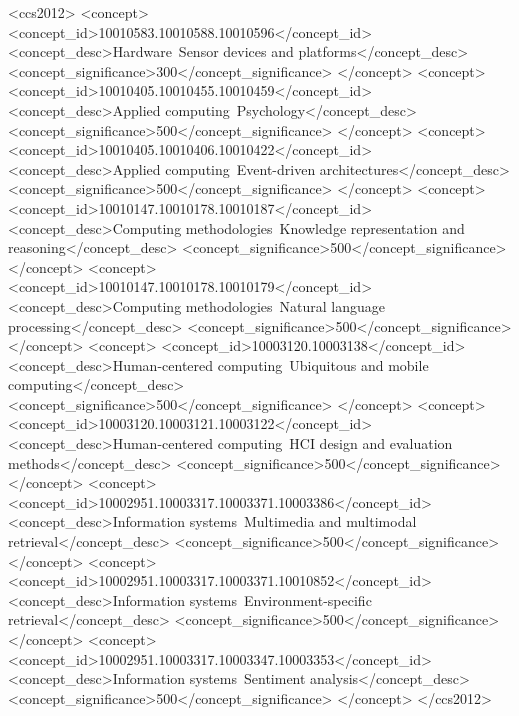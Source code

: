 \documentclass{sigchi}
\begin{document}
\begin{CCSXML}
<ccs2012>
<concept>
<concept_id>10010583.10010588.10010596</concept_id>
<concept_desc>Hardware~Sensor devices and platforms</concept_desc>
<concept_significance>300</concept_significance>
</concept>
<concept>
<concept_id>10010405.10010455.10010459</concept_id>
<concept_desc>Applied computing~Psychology</concept_desc>
<concept_significance>500</concept_significance>
</concept>
<concept>
<concept_id>10010405.10010406.10010422</concept_id>
<concept_desc>Applied computing~Event-driven architectures</concept_desc>
<concept_significance>500</concept_significance>
</concept>
<concept>
<concept_id>10010147.10010178.10010187</concept_id>
<concept_desc>Computing methodologies~Knowledge representation and reasoning</concept_desc>
<concept_significance>500</concept_significance>
</concept>
<concept>
<concept_id>10010147.10010178.10010179</concept_id>
<concept_desc>Computing methodologies~Natural language processing</concept_desc>
<concept_significance>500</concept_significance>
</concept>
<concept>
<concept_id>10003120.10003138</concept_id>
<concept_desc>Human-centered computing~Ubiquitous and mobile computing</concept_desc>
<concept_significance>500</concept_significance>
</concept>
<concept>
<concept_id>10003120.10003121.10003122</concept_id>
<concept_desc>Human-centered computing~HCI design and evaluation methods</concept_desc>
<concept_significance>500</concept_significance>
</concept>
<concept>
<concept_id>10002951.10003317.10003371.10003386</concept_id>
<concept_desc>Information systems~Multimedia and multimodal retrieval</concept_desc>
<concept_significance>500</concept_significance>
</concept>
<concept>
<concept_id>10002951.10003317.10003371.10010852</concept_id>
<concept_desc>Information systems~Environment-specific retrieval</concept_desc>
<concept_significance>500</concept_significance>
</concept>
<concept>
<concept_id>10002951.10003317.10003347.10003353</concept_id>
<concept_desc>Information systems~Sentiment analysis</concept_desc>
<concept_significance>500</concept_significance>
</concept>
</ccs2012>
\end{CCSXML}

\end{document}
